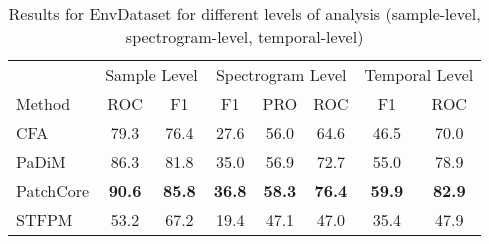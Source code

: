 \begin{table}[htb]
\caption{Results for EnvDataset  for different levels of analysis (sample-level, spectrogram-level, temporal-level) }
\label{tab:anomaly_detection_comparison}
\centering
\begin{tabular}{lccccccc}
\toprule
& \multicolumn{2}{c}{Sample Level} & \multicolumn{3}{c}{Spectrogram Level}   & \multicolumn{2}{c}{Temporal Level} \\
\multicolumn{1}{l|}{Method} & ROC  & \multicolumn{1}{c|}{F1}   & F1   & PRO  & \multicolumn{1}{c|}{ROC}  & F1               & ROC             \\ \midrule
\multicolumn{1}{l|}{CFA}    & 79.3 & \multicolumn{1}{c|}{76.4} & 27.6 & 56.0 & \multicolumn{1}{c|}{64.6} & 46.5             & 70.0            \\
\multicolumn{1}{l|}{PaDiM}  & 86.3 & \multicolumn{1}{c|}{81.8} & 35.0 & 56.9 & \multicolumn{1}{c|}{72.7} & 55.0             & 78.9            \\
\multicolumn{1}{l|}{PatchCore} &
  \textbf{90.6} &
  \multicolumn{1}{c|}{\textbf{85.8}} &
  \textbf{36.8} &
  \textbf{58.3} &
  \multicolumn{1}{c|}{\textbf{76.4}} &
  \textbf{59.9} &
  \textbf{82.9} \\
\multicolumn{1}{l|}{STFPM}  & 53.2 & \multicolumn{1}{c|}{67.2} & 19.4 & 47.1 & \multicolumn{1}{c|}{47.0} & 35.4             & 47.9  \\
\bottomrule
\end{tabular}%
\end{table}
